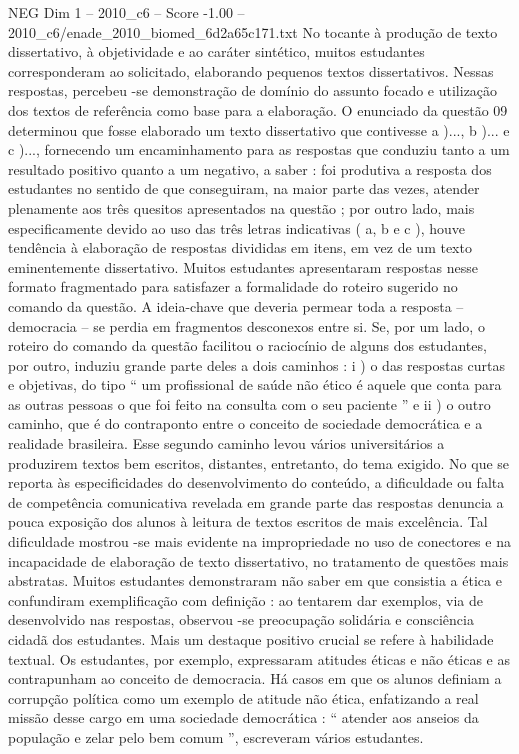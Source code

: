 \begin{textsample}{NEG Dim 1 – 2010\_c6 – Score -1.00 – 2010\_c6/enade\_2010\_biomed\_6d2a65c171.txt}
No tocante à produção de texto dissertativo, à objetividade e ao caráter sintético, muitos estudantes corresponderam ao solicitado, elaborando pequenos textos dissertativos.
Nessas respostas, percebeu -se demonstração de domínio do assunto focado e utilização dos textos de referência como base para a elaboração.
O enunciado da questão 09 determinou que fosse elaborado um texto dissertativo que contivesse a )..., b )... e c )..., fornecendo um encaminhamento para as respostas que conduziu tanto a um resultado positivo quanto a um negativo, a saber : foi produtiva a resposta dos estudantes no sentido de que conseguiram, na maior parte das vezes, atender plenamente aos três quesitos apresentados na questão ; por outro lado, mais especificamente devido ao uso das três letras indicativas ( a, b e c ), houve tendência à elaboração de respostas divididas em itens, em vez de um texto eminentemente dissertativo.
Muitos estudantes apresentaram respostas nesse formato fragmentado para satisfazer a formalidade do roteiro sugerido no comando da questão.
A ideia-chave que deveria permear toda a resposta – democracia – se perdia em fragmentos desconexos entre si.
Se, por um lado, o roteiro do comando da questão facilitou o raciocínio de alguns dos estudantes, por outro, induziu grande parte deles a dois caminhos : i ) o das respostas curtas e objetivas, do tipo “ um profissional de saúde não ético é aquele que conta para as outras pessoas o que foi feito na consulta com o seu paciente ” e ii ) o outro caminho, que é do contraponto entre o conceito de sociedade democrática e a realidade brasileira.
Esse segundo caminho levou vários universitários a produzirem textos bem escritos, distantes, entretanto, do tema exigido.
No que se reporta às especificidades do desenvolvimento do conteúdo, a dificuldade ou falta de competência comunicativa revelada em grande parte das respostas denuncia a pouca exposição dos alunos à leitura de textos escritos de mais excelência.
Tal dificuldade mostrou -se mais evidente na impropriedade no uso de conectores e na incapacidade de elaboração de texto dissertativo, no tratamento de questões mais abstratas.
Muitos estudantes demonstraram não saber em que consistia a ética e confundiram exemplificação com definição : ao tentarem dar exemplos, via de desenvolvido nas respostas, observou -se preocupação solidária e consciência cidadã dos estudantes.
Mais um destaque positivo crucial se refere à habilidade textual.
Os estudantes, por exemplo, expressaram atitudes éticas e não éticas e as contrapunham ao conceito de democracia.
Há casos em que os alunos definiam a corrupção política como um exemplo de atitude não ética, enfatizando a real missão desse cargo em uma sociedade democrática : “ atender aos anseios da população e zelar pelo bem comum ”, escreveram vários estudantes.

\end{textsample}
